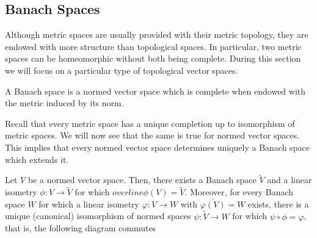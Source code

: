 \subsection{Banach Spaces}

Although metric spaces are usually provided with their metric topology, they are endowed with more structure than topological spaces. In particular, two metric spaces can be homeomorphic without both being complete. During this section we will focus on a particular type of topological vector spaces.

\begin{definition}
	A Banach space is a normed vector space which is complete when endowed with the metric induced by its norm.
\end{definition}

Recall that every metric space has a unique completion up to isomorphism of metric spaces. We will now see that the same is true for normed vector spaces. This implies that every normed vector space determines uniquely a Banach space which extends it.

\begin{theorem}
	Let $V$ be a normed vector space. Then, there exists a Banach space $\tilde{V}$ and a linear isometry $\phi:V\rightarrow\tilde{V}$ for which $overline{\phi(V)}=\tilde{V}$. Moreover, for every Banach space $W$ for which a linear isometry $\varphi:V\rightarrow W$ with $\overline{\varphi(V)}=W$ exists, there is a unique (canonical) isomorphism of normed spaces $\psi:\tilde{V}\rightarrow W$ for which $\psi\circ\phi=\varphi$, that is, the following diagram commutes
	
	\begin{center}
	\end{center}
\end{theorem}

